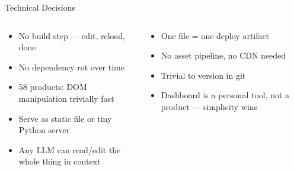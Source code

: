 \documentclass[aspectratio=169,12pt]{beamer}
\begin{document}
\begin{frame}[t,shrink=25]{Technical Decisions}
  \begin{columns}[T]
      \begin{tcolorbox}[pantrybox,title={Why Vanilla JS?}]
        {\footnotesize
        \begin{itemize}[leftmargin=*,itemsep=3pt]
          \item No build step --- edit, reload, done
          \item No dependency rot over time
          \item 58 products: DOM manipulation trivially fast
          \item Serve as static file or tiny Python server
          \item Any LLM can read/edit the whole thing in context
        \end{itemize}
        }
      \end{tcolorbox}
      \vspace{0.2cm}
      \begin{tcolorbox}[pantrybox,title={Why Single-File HTML?}]
        {\footnotesize
        \begin{itemize}[leftmargin=*,itemsep=3pt]
          \item One file = one deploy artifact
          \item No asset pipeline, no CDN needed
          \item Trivial to version in git
          \item Dashboard is a personal tool, not a product --- simplicity wins
        \end{itemize}
        }
      \end{tcolorbox}


\end{columns}
\end{frame}
\end{document}
